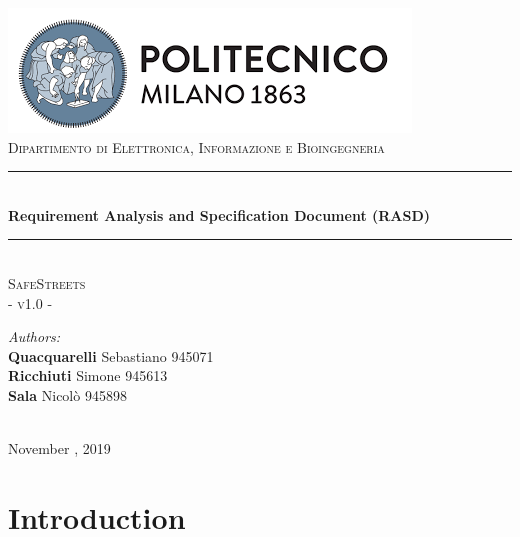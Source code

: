 \documentclass{article}
\begin{document}
	\begin{titlepage}
		
		\centering
		\vspace*{0.7 cm}
		\includegraphics[scale = 0.7]{images/PolimiLogo.png}\\[1 cm]
		\textsc{\large Dipartimento di Elettronica, Informazione e Bioingegneria}\\[2 cm]
		
		\rule{\linewidth}{0.2 mm} \\[0.5 cm]
		{\huge \bfseries Requirement Analysis and Specification Document (RASD)}\\
		\rule{\linewidth}{0.2 mm} \\[1.5 cm]
		
		\textsc{\Large SafeStreets}\\[0.5 cm]
		\textsc{\large - v1.0 -}\\[1 cm]
		
		\begin{minipage}{\textwidth}
			\begin{flushleft} \large
				\emph{Authors:}\\
				\textbf{Quacquarelli} Sebastiano \hfill 945071 \\
				\textbf{Ricchiuti} Simone \hfill 945613  \\
				\textbf{Sala} Nicolò \hfill 945898  \\[2 cm]
			\end{flushleft}
		\end{minipage}\\[2 cm]
		
		{\large November  , 2019}\\[2 cm]
		
	\end{titlepage}
	
	\tableofcontents
	
	\newpage
	\setcounter{page}{1}
	
	\section{Introduction}
	
\end{document}
